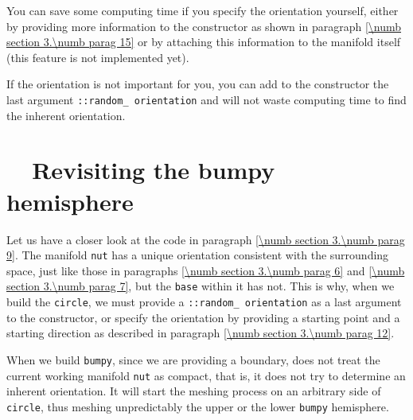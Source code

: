 You can save some computing time if you specify the orientation
yourself, either by providing more information to the {\small\tt {}} constructor as shown
in paragraph \ref{\numb section 3.\numb parag 15} or by attaching this information to
the manifold itself (this feature is not implemented yet).
 
If the orientation is not important for you, you can add to the {\small\tt {}} constructor
the last argument {\small\tt {}::random\_\,orientation} and {\maniFEM} will not waste
computing time to find the inherent orientation.
\vskip 1mm

\section{~~Revisiting the bumpy hemisphere}\label{\numb section 3.\numb parag 14}

Let us have a closer look at the code in paragraph \ref{\numb section 3.\numb parag 9}.
The manifold {\small\tt nut} has a unique orientation consistent with the surrounding
space, just like those in paragraphs \ref{\numb section 3.\numb parag 6} and
\ref{\numb section 3.\numb parag 7}, but the {\small\tt base} within it has not.
This is why, when we build the {\small\tt circle}, we must provide a
{\small\tt {}::random\_\,orientation} as a last argument to the {\small\tt {}} constructor,
or specify the orientation by providing a starting point and a starting direction
as described in paragraph \ref{\numb section 3.\numb parag 12}.

When we build {\small\tt bumpy}, since we are providing a boundary, {\maniFEM} does not treat
the current working manifold {\small\tt nut} as compact, that is, it does not try to determine an
inherent orientation.
It will start the meshing process on an arbitrary side of {\small\tt circle}, thus meshing
unpredictably the upper or the lower {\small\tt bumpy} hemisphere.


